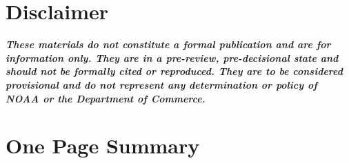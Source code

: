 \documentclass[11pt,
  english,
  letterpaper,
]{article}
\begin{document}
\pagestyle{plain}  %
\renewcommand*{\thefootnote}{\arabic{footnote}}  %
\setcounter{footnote}{0}  %
\renewcommand{\headrulewidth}{0.5pt}
\renewcommand{\footrulewidth}{0.5pt}

\newcommand{\lt}{\ensuremath <}
\newcommand{\gt}{\ensuremath >}

\vspace{500cm}

\hypertarget{disclaimer}{%
\section*{Disclaimer}\label{disclaimer}}

\emph{\textbf{These materials do not constitute a formal publication and are for information only. They are in a pre-review, pre-decisional state and should not be formally cited or reproduced. They are to be considered provisional and do not represent any determination or policy of NOAA or the Department of Commerce.}}

\pagebreak
{}
\setcounter{page}{1}

\renewcommand{\thetable}{\roman{table}}
\renewcommand{\thefigure}{\roman{figure}}

\setlength\parskip{0.5em plus 0.1em minus 0.2em}

\hypertarget{one-page-summary}{%
\section*{One Page Summary}\label{one-page-summary}}
\end{document}
